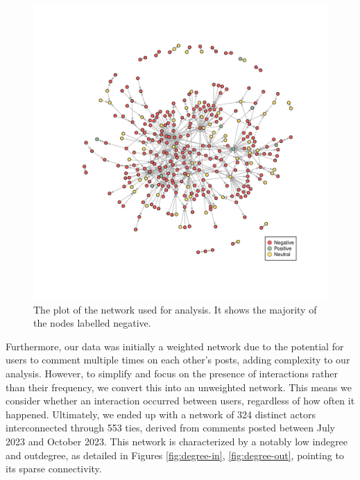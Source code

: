 \documentclass[
  man,floatsintext]{apa6}
\begin{document}
\begin{figure}[H]

{\centering \includegraphics{SNA4DS_Report_files/figure-latex/main-network-plot-1} 

}

\caption{The plot of the network used for analysis. It shows the majority of the nodes labelled negative.}\label{fig:main-network-plot}
\end{figure}
\newpage

Furthermore, our data was initially a weighted network due to the potential for users to comment multiple times on each other's posts, adding complexity to our analysis. However, to simplify and focus on the presence of interactions rather than their frequency, we convert this into an unweighted network. This means we consider whether an interaction occurred between users, regardless of how often it happened.
Ultimately, we ended up with a network of 324 distinct actors interconnected through 553 ties, derived from comments posted between July 2023 and October 2023. This network is characterized by a notably low indegree and outdegree, as detailed in Figures \ref{fig:degree-in}, \ref{fig:degree-out}, pointing to its sparse connectivity.
\end{document}
